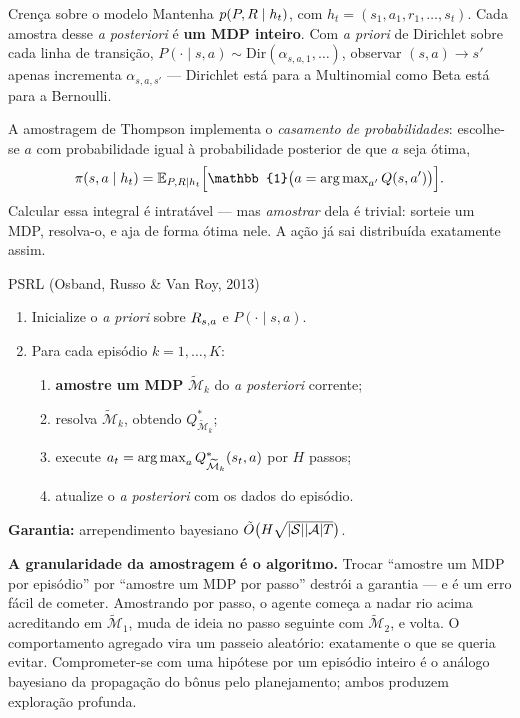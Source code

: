\documentclass[11pt, a4paper]{article}
\newcommand{\hist}{h_t}
\newcommand{\Mdp}{\mathcal{M}}
\newcommand{\Mtil}{\widetilde{\Mdp}}
\newcommand{\Dir}{\mathrm{Dir}}
\begin{document}
\begin{defbox}{Crença sobre o modelo}
Mantenha $p(P, \rec \mid \hist)$, com $\hist = (s_1,a_1,r_1,\ldots,s_t)$. Cada amostra
desse \textit{a posteriori} é \textbf{um MDP inteiro}. Com \textit{a priori} de Dirichlet
sobre cada linha de transição, $P(\cdot\mid s,a) \sim \Dir(\alpha_{s,a,1},\ldots)$,
observar $(s,a)\to s'$ apenas incrementa $\alpha_{s,a,s'}$ --- Dirichlet está para a
Multinomial como Beta está para a Bernoulli.
\end{defbox}

A amostragem de Thompson implementa o \emph{casamento de probabilidades}: escolhe-se
$a$ com probabilidade igual à probabilidade posterior de que $a$ seja ótima,
\[
  \pol(s,a\mid \hist)
  = \E_{P,\rec \mid \hist}\Bigl[\mathbb{1}\bigl(a = \argmax\nolimits_{a'} Q(s,a')\bigr)\Bigr].
\]
Calcular essa integral é intratável --- mas \emph{amostrar} dela é trivial: sorteie um MDP,
resolva-o, e aja de forma ótima nele. A ação já sai distribuída exatamente assim.

\begin{algbox}{PSRL (Osband, Russo \& Van Roy, 2013)}
\begin{enumerate}\setlength{\itemsep}{0.05em}
  \item Inicialize o \textit{a priori} sobre $R_{s,a}$ e $P(\cdot\mid s,a)$.
  \item Para cada episódio $k = 1,\ldots,K$:
  \begin{enumerate}
    \item \textbf{amostre um MDP} $\Mtil_k$ do \textit{a posteriori} corrente;
    \item resolva $\Mtil_k$, obtendo $Q^{*}_{\Mtil_k}$;
    \item execute $a_t = \argmax_a Q^{*}_{\Mtil_k}(s_t,a)$ por $H$ passos;
    \item atualize o \textit{a posteriori} com os dados do episódio.
  \end{enumerate}
\end{enumerate}
\textbf{Garantia:} arrependimento bayesiano $\tilde{O}\bigl(H\sqrt{\lvert\mathcal{S}\rvert\lvert\mathcal{A}\rvert T}\bigr)$.
\end{algbox}

\begin{alertabox}
\textbf{A granularidade da amostragem é o algoritmo.} Trocar ``amostre um MDP por
episódio'' por ``amostre um MDP por passo'' destrói a garantia --- e é um erro fácil de
cometer. Amostrando por passo, o agente começa a nadar rio acima acreditando em
$\Mtil_1$, muda de ideia no passo seguinte com $\Mtil_2$, e volta. O comportamento
agregado vira um passeio aleatório: exatamente o que se queria evitar. Comprometer-se com
uma hipótese por um episódio inteiro é o análogo bayesiano da propagação do bônus pelo
planejamento; ambos produzem exploração profunda.
\end{alertabox}
\end{document}
